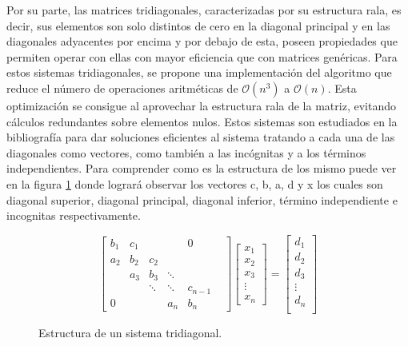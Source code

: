 Por su parte, las matrices tridiagonales, caracterizadas por su estructura rala, es decir, sus elementos son solo distintos de cero en la diagonal principal y en las diagonales adyacentes por encima y por debajo de esta, poseen propiedades que permiten operar con ellas con mayor eficiencia que con matrices genéricas. Para estos sistemas tridiagonales, se propone una implementación del algoritmo que reduce el número de operaciones aritméticas de $\mathcal{O}(n^3)$ a $\mathcal{O}(n)$. Esta optimización se consigue al aprovechar la estructura rala de la matriz, evitando cálculos redundantes sobre elementos nulos. Estos sistemas son estudiados en la bibliografía \cite{Recipes07} para dar soluciones eficientes al sistema tratando a cada una de las diagonales como vectores, como también a las incógnitas y a los términos independientes. Para comprender como es la estructura de los mismo puede ver en la figura \ref{fig:tridiagonal} donde logrará observar los vectores c, b, a, d y x los cuales son diagonal superior, diagonal principal, diagonal inferior, término independiente e incognitas respectivamente.  

\begin{figure}[h]

    \[ \begin{bmatrix}
b_1 & c_1 & & & 0\\
a_2 & b_2 & c_2 & & & \\
    & a_3 & b_3 & \ddots & \\
    &    & \ddots &  \ddots&c_{n-1}\\
0   &    &   & a_n & b_n
     \end{bmatrix}
  \begin{bmatrix}
        x_{1}\\
        x_{2} \\
        x_{3}\\ 
        \vdots\\ 
        x_{n}  
 \end{bmatrix}
 =
 \begin{bmatrix}
     d_{1} \\
     d_{2} \\
     d_{3} \\
     \vdots \\
     d_{n} \\
 \end{bmatrix}
 \]
 
 \caption{Estructura de un sistema tridiagonal.}
 \label{fig:tridiagonal}
\end{figure}

